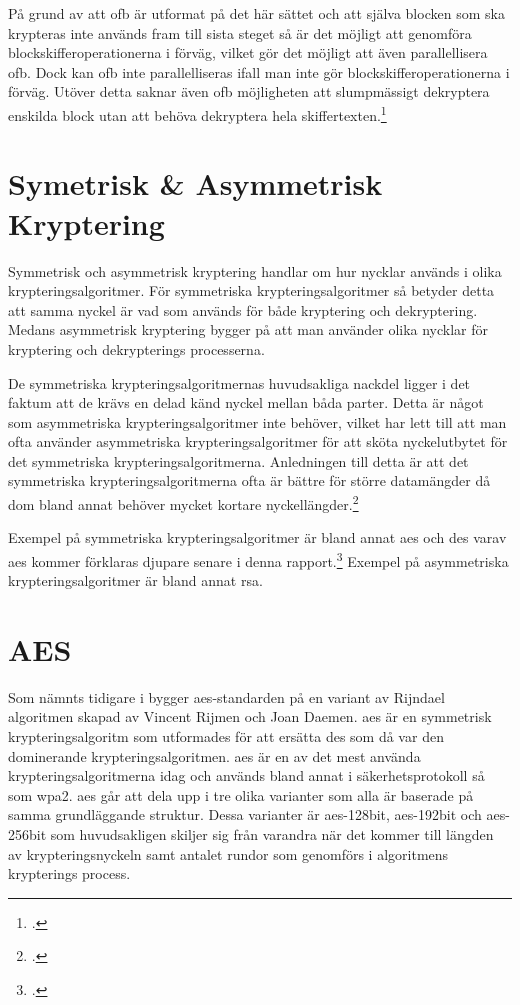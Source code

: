 På grund av att \acrshort{ofb} är utformat på det här sättet och att själva blocken som
ska krypteras inte används fram till sista steget så är det möjligt att genomföra blockskifferoperationerna
i förväg, vilket gör det möjligt att även parallellisera \acrshort{ofb}. Dock
kan \acrshort{ofb} inte parallelliseras ifall man inte gör blockskifferoperationerna
i förväg. Utöver detta saknar även \acrshort{ofb} möjligheten att slumpmässigt dekryptera
enskilda block utan att behöva dekryptera hela skiffertexten.\footcite{dworkin2001sp}

\section{Symetrisk \& Asymmetrisk Kryptering}
\label{sec:symmetric-asymmetric-encryption}
Symmetrisk och asymmetrisk kryptering handlar om hur nycklar används i olika
krypteringsalgoritmer. För symmetriska krypteringsalgoritmer så betyder detta
att samma nyckel är vad som används för både kryptering och dekryptering. Medans
asymmetrisk kryptering bygger på att man använder olika nycklar för kryptering och
dekrypterings processerna.

De symmetriska krypteringsalgoritmernas huvudsakliga nackdel ligger i det faktum att
de krävs en delad känd nyckel mellan båda parter. Detta är något som asymmetriska
krypteringsalgoritmer inte behöver, vilket har lett till att man ofta använder
asymmetriska krypteringsalgoritmer för att sköta nyckelutbytet för det symmetriska
krypteringsalgoritmerna. Anledningen till detta är att det symmetriska krypteringsalgoritmerna
ofta är bättre för större datamängder då dom bland annat behöver mycket
kortare nyckellängder.\footcite{symencrypt}

Exempel på symmetriska krypteringsalgoritmer är bland annat \acrshort{aes} och
\acrshort{des} varav \acrshort{aes} kommer förklaras djupare senare i denna rapport.\footcite{symencrypt}
Exempel på asymmetriska krypteringsalgoritmer är bland annat \gls{rsa}.

\section{AES}
\label{sec:aes}

Som nämnts tidigare i  bygger \acrshort{aes}-standarden på en variant av Rijndael  algoritmen
skapad av Vincent Rijmen och Joan Daemen. \acrshort{aes} är en symmetrisk krypteringsalgoritm som utformades för att ersätta
\acrshort{des} som då var den dominerande krypteringsalgoritmen. \acrshort{aes} är en av det mest använda krypteringsalgoritmerna idag
och används bland annat i säkerhetsprotokoll så som \acrfull{wpa2}. \acrshort{aes} går att dela upp i tre olika varianter
som alla är baserade på samma grundläggande struktur. Dessa varianter är \acrshort{aes}-128bit, \acrshort{aes}-192bit och \acrshort{aes}-256bit som huvudsakligen
skiljer sig från varandra när det kommer till längden av krypteringsnyckeln samt antalet rundor som genomförs i algoritmens krypterings process.

